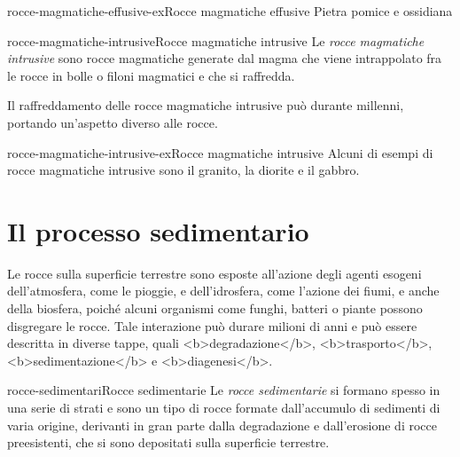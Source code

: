 \documentclass[preview]{standalone}
\begin{document}
\begin{snippetexample}{rocce-magmatiche-effusive-ex}{Rocce magmatiche effusive}
    Pietra pomice e ossidiana
\end{snippetexample}

\begin{snippetdefinition}{rocce-magmatiche-intrusive}{Rocce magmatiche intrusive}
    Le \textit{rocce magmatiche intrusive} sono rocce magmatiche generate
    dal magma che viene intrappolato fra le rocce in bolle o filoni magmatici
    e che si raffredda.
\end{snippetdefinition}

\begin{plainhtml}
    Il raffreddamento delle rocce magmatiche intrusive può durante millenni,
    portando un'aspetto diverso alle rocce.
\end{plainhtml}

\begin{snippetexample}{rocce-magmatiche-intrusive-ex}{Rocce magmatiche intrusive}
    Alcuni di esempi di rocce magmatiche intrusive sono il granito, la diorite
    e il gabbro.
\end{snippetexample}

\section{Il processo sedimentario}

\begin{plainhtml}
    Le rocce sulla superficie terrestre sono esposte all'azione degli agenti esogeni
    dell'atmosfera, come le pioggie, e dell'idrosfera, come l'azione dei fiumi,
    e anche della biosfera, poiché alcuni organismi come funghi, batteri o piante possono disgregare le rocce.
    Tale interazione può durare milioni di anni e può essere descritta in diverse tappe,
    quali <b>degradazione</b>, <b>trasporto</b>, <b>sedimentazione</b> e <b>diagenesi</b>.
\end{plainhtml}

\begin{snippetdefinition}{rocce-sedimentari}{Rocce sedimentarie}
    Le \textit{rocce sedimentarie} si formano spesso in una serie
    di strati e sono un tipo di rocce formate dall'accumulo
    di sedimenti di varia origine,
    derivanti in gran parte dalla degradazione e dall'erosione di rocce preesistenti,
    che si sono depositati sulla superficie terrestre. 
\end{snippetdefinition}
\end{document}
